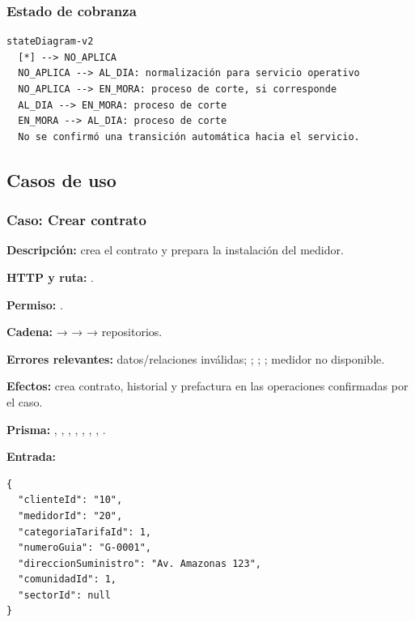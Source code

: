\subsubsection{Estado de cobranza}
\begin{lstlisting}
stateDiagram-v2
  [*] --> NO_APLICA
  NO_APLICA --> AL_DIA: normalización para servicio operativo
  NO_APLICA --> EN_MORA: proceso de corte, si corresponde
  AL_DIA --> EN_MORA: proceso de corte
  EN_MORA --> AL_DIA: proceso de corte
  No se confirmó una transición automática hacia el servicio.
\end{lstlisting}


\subsection{Casos de uso}


\subsubsection{Caso: Crear contrato}


\textbf{Descripción:} crea el contrato y prepara la instalación del medidor.  

\textbf{HTTP y ruta:} \texttt{}.  

\textbf{Permiso:} \texttt{}.  

\textbf{Cadena:} \texttt{} → \texttt{} → \texttt{} → repositorios.  

\textbf{Errores relevantes:} \texttt{} datos/relaciones inválidas; \texttt{}; \texttt{}; \texttt{}; medidor no disponible.  

\textbf{Efectos:} crea contrato, historial y prefactura en las operaciones confirmadas por el caso.  

\textbf{Prisma:} \texttt{}, \texttt{}, \texttt{}, \texttt{}, \texttt{}, \texttt{}, \texttt{}, \texttt{}.  

\textbf{Entrada:}


\begin{lstlisting}
{
  "clienteId": "10",
  "medidorId": "20",
  "categoriaTarifaId": 1,
  "numeroGuia": "G-0001",
  "direccionSuministro": "Av. Amazonas 123",
  "comunidadId": 1,
  "sectorId": null
}
\end{lstlisting}


